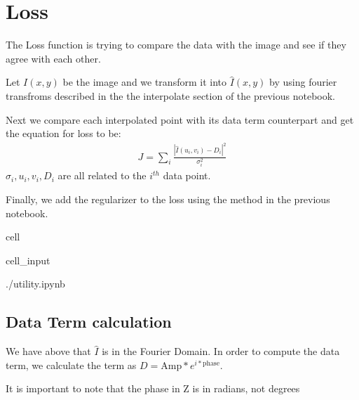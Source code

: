 \documentclass[letterpaper,10pt,english]{jupyterBook}
\begin{document}
\chapter{Loss}
\label{\detokenize{loss:loss}}\label{\detokenize{loss::doc}}
\sphinxAtStartPar
The Loss function is trying to compare the data with the image and see if they agree with each other.

\sphinxAtStartPar
Let \(I(x,y)\) be the image and we transform it into \(\hat{I} (x,y)\) by using fourier transfroms described in the the interpolate section of the previous notebook.

\sphinxAtStartPar
Next we compare each interpolated point with its data term counterpart and get the equation for loss to be:
\begin{equation*}
\begin{split}J = \sum_{i}\frac{|\hat{I}(u_i,v_i) - D_i|^2}{\sigma_i^2}\end{split}
\end{equation*}
\sphinxAtStartPar
\(\sigma_i, u_i, v_i, D_i\) are all related to the \(i^{th}\) data point.

\sphinxAtStartPar
Finally, we add the regularizer to the loss using the method in the previous notebook.

\begin{sphinxuseclass}{cell}\begin{sphinxVerbatimInput}

\begin{sphinxuseclass}{cell_input}
\begin{sphinxVerbatim}[commandchars=\\\{\}]
 ./utility.ipynb
\end{sphinxVerbatim}

\end{sphinxuseclass}\end{sphinxVerbatimInput}

\end{sphinxuseclass}

\section{Data Term calculation}
\label{\detokenize{loss:data-term-calculation}}
\sphinxAtStartPar
We have above that \(\hat{I}\) is in the Fourier Domain. In order to compute the data term, we calculate the term as \(D = \text{Amp} * e^{i*\text{phase}}\).

\sphinxAtStartPar
It is important to note that the phase in Z is in radians, not degrees
\end{document}
